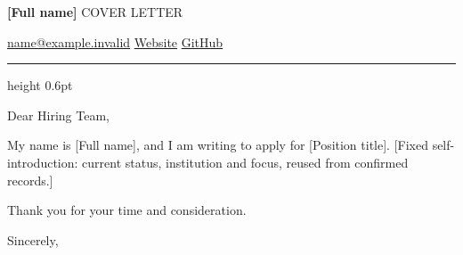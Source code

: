 \documentclass[11pt,a4paper]{article}
\newcommand{\LetterRoleTitle}{[Position title]}
\begin{document}
{\sffamily\bfseries\fontsize{24}{28}\selectfont\color{LetterAccent} [Full name]}%
\hfill{\sffamily\fontsize{8}{10}\selectfont\color{LetterMuted} COVER LETTER}\par
\vspace{-0.35em}
{\sffamily\fontsize{9}{11}\selectfont\color{LetterMuted}
\href{mailto:name@example.invalid}{name@example.invalid}\enspace\textbar{}\enspace
\href{https://example.invalid/}{Website}\enspace\textbar{}\enspace
\href{https://example.invalid/github}{GitHub}}

\vspace{0.35em}
{\color{LetterAccent}\hrule height 0.6pt}
\vspace{1em}

Dear Hiring Team,

My name is [Full name], and I am writing to apply for \LetterRoleTitle{}. [Fixed self-introduction: current status, institution and focus, reused from confirmed records.]


\vspace{0.15em}
Thank you for your time and consideration.

\vspace{0.25em}
\nopagebreak[4]
Sincerely,\\
[Full name]
\end{document}

